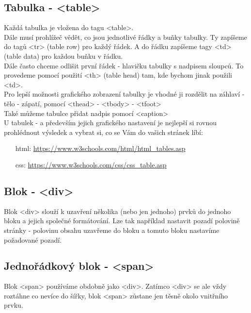 \subsection{Tabulka - <table>}
Každá tabulka je vložena do tagu <table>.\\
Dále musí prohlížeč vědět, co jsou jednotlivé řádky a buňky tabulky. Ty zapíšeme do tagů <tr> (table row) pro každý řádek. A do řádku zapíšeme tagy <td> (table data) pro každou buňku v řádku.\\
Dále často chceme odlišit první řádek - hlavičku tabulky s nadpisem sloupců. To provedeme pomocí použití <th> (table head) tam, kde bychom jinak použili <td>.\\

\vspace{0.5cm}
Pro lepší možnosti grafického zobrazení tabulky je vhodné ji rozdělit na záhlaví - tělo - zápatí, pomocí <thead> - <tbody> - <tfoot>\\
Také můžeme tabulce přidat nadpis pomocí <caption>\\

\vspace{1cm}
U tabulek - a především jejich grafického nastavení je nejlepší si rovnou prohlédnout výsledek a vybrat si, co se Vám do vašich stránek líbí:
\begin{itemize}
\item[html:] \url{https://www.w3schools.com/html/html_tables.asp} 
\item[css:] \url{https://www.w3schools.com/css/css_table.asp}
\end{itemize}


\subsection{Blok - <div>}
Blok <div> slouží k uzavření několika (nebo jen jednoho) prvků do jednoho bloku a jejich společné formátování. Lze tak například nastavit pozadí polovině stránky - polovinu obsahu uzavřeme do bloku a tomuto bloku nastavíme požadované pozadí.

\subsection{Jednořádkový blok - <span>}
Blok <span> používáme obdobně jako <div>. Zatímco <div> se ale vždy roztáhne co nevíce do šířky, blok <span> zůstane jen těsně okolo vnitřního prvku.

